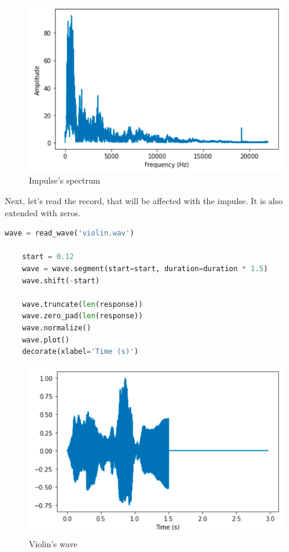 \documentclass[a4paper]{article}
\begin{document}
        \begin{figure}[H]
            \centering
            \includegraphics[width=\textwidth]{img/p2_2.png}
            \caption{Impulse's spectrum}
            \label{fig:part1_1_2}
        \end{figure}
        
        Next, let's read the record, that will be affected with the impulse. It is also extended with zeros.
        
        \begin{lstlisting}[language=Python,caption=Reading a violin sound,label={lst:part1_2}]
    wave = read_wave('violin.wav')

    start = 0.12
    wave = wave.segment(start=start, duration=duration * 1.5)
    wave.shift(-start)
    
    wave.truncate(len(response))
    wave.zero_pad(len(response))
    wave.normalize()
    wave.plot()
    decorate(xlabel='Time (s)')
        \end{lstlisting}
        
        \begin{figure}[H]
            \centering
            \includegraphics[width=\textwidth]{img/p2_3.png}
            \caption{Violin's wave}
            \label{fig:part1_1_2}
        \end{figure}
        
\end{document}
